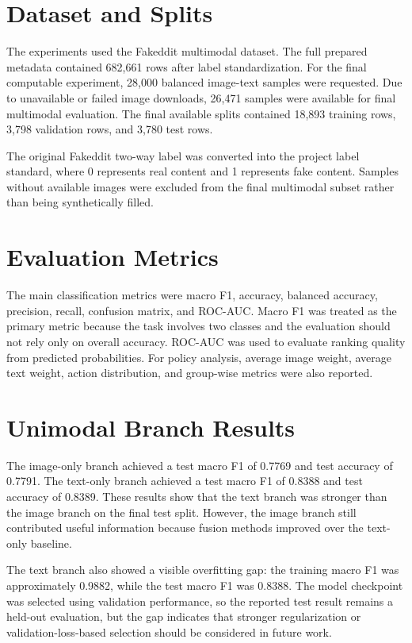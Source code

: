 \section{Dataset and Splits}


The experiments used the Fakeddit multimodal dataset. The full prepared metadata contained 682,661 rows after label standardization. For the final computable experiment, 28,000 balanced image-text samples were requested. Due to unavailable or failed image downloads, 26,471 samples were available for final multimodal evaluation. The final available splits contained 18,893 training rows, 3,798 validation rows, and 3,780 test rows.


The original Fakeddit two-way label was converted into the project label standard, where 0 represents real content and 1 represents fake content. Samples without available images were excluded from the final multimodal subset rather than being synthetically filled.


\section{Evaluation Metrics}


The main classification metrics were macro F1, accuracy, balanced accuracy, precision, recall, confusion matrix, and ROC-AUC. Macro F1 was treated as the primary metric because the task involves two classes and the evaluation should not rely only on overall accuracy. ROC-AUC was used to evaluate ranking quality from predicted probabilities. For policy analysis, average image weight, average text weight, action distribution, and group-wise metrics were also reported.


\section{Unimodal Branch Results}


The image-only branch achieved a test macro F1 of 0.7769 and test accuracy of 0.7791. The text-only branch achieved a test macro F1 of 0.8388 and test accuracy of 0.8389. These results show that the text branch was stronger than the image branch on the final test split. However, the image branch still contributed useful information because fusion methods improved over the text-only baseline.


The text branch also showed a visible overfitting gap: the training macro F1 was approximately 0.9882, while the test macro F1 was 0.8388. The model checkpoint was selected using validation performance, so the reported test result remains a held-out evaluation, but the gap indicates that stronger regularization or validation-loss-based selection should be considered in future work.


